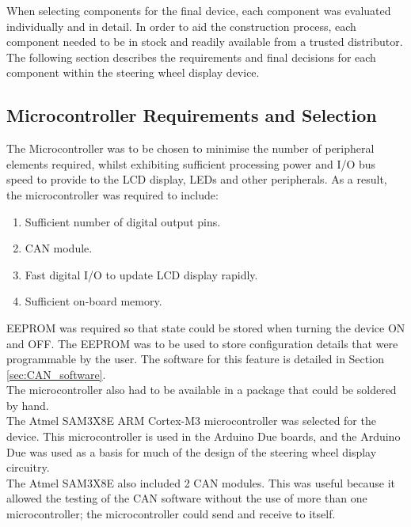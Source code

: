 \documentclass[a4paper,12pt]{article}
\begin{document}
When selecting components for the final device, each component was evaluated individually and in detail. In order to aid the construction process, each component needed to be in stock and readily available from a trusted distributor. The following section describes the requirements and final decisions for each component within the steering wheel display device. \\

\subsection{Microcontroller Requirements and Selection}
\label{sec:microcontroller}

The Microcontroller was to be chosen to minimise the number of peripheral elements required, whilst exhibiting sufficient processing power and I/O bus speed to provide to the LCD display, LEDs and other peripherals. As a result, the microcontroller was required to include:

\begin{enumerate}
  \item Sufficient number of digital output pins.
  \item CAN module.
  \item Fast digital I/O to update LCD display rapidly.
  \item Sufficient on-board memory.
\end{enumerate}
\vspace{1cm}

EEPROM was required so that state could be stored when turning the device ON and OFF. The EEPROM was to be used to store configuration details that were programmable by the user. The software for this feature is detailed in Section \ref{sec:CAN_software}. \\

The microcontroller also had to be available in a package that could be soldered by hand. \\

The Atmel SAM3X8E ARM Cortex-M3 microcontroller was selected for the device. This microcontroller is used in the Arduino Due boards, and the Arduino Due was used as a basis for much of the design of the steering wheel display circuitry. \\

The Atmel SAM3X8E also included 2 CAN modules. This was useful because it allowed the testing of the CAN software without the use of more than one microcontroller; the microcontroller could send and receive to itself. \\
\end{document}
